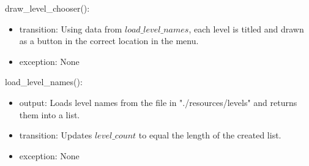 \documentclass[12pt]{article}
\begin{document}
\noindent draw\_level\_chooser():
\begin{itemize}
\item transition: Using data from $load\_level\_names$, each level is titled and drawn as a button in the correct location in the menu.

\item exception: None

\end{itemize}

\noindent load\_level\_names():
\begin{itemize}
\item output: Loads level names from the file in "./resources/levels" and returns them into a list.
\item transition: Updates $level\_count$ to equal the length of the created list.

\item exception: None

\end{itemize}
\end{document}
